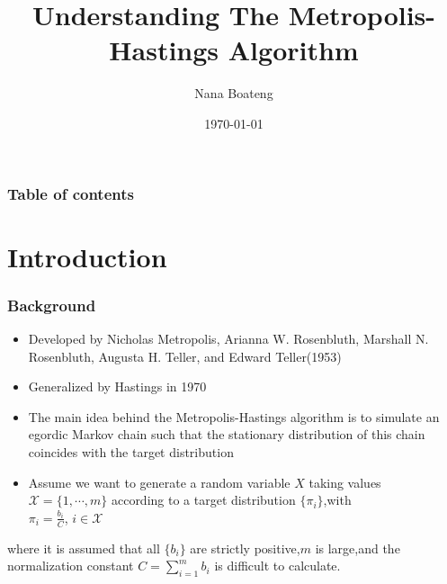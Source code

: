 \documentclass[hyperref={pdfpagelabels=false}]{beamer}
\title{Understanding The Metropolis-Hastings Algorithm}
\author{Nana Boateng }
\date{\today}
\begin{document}
\begin{frame}
\titlepage
\end{frame} 

\begin{frame}
\frametitle{Table of contents}
\tableofcontents
\end{frame}
 



\section{Introduction} 

\begin{frame}
\frametitle{Background }
\begin{itemize}
\item  Developed by Nicholas Metropolis, Arianna W. Rosenbluth, Marshall N. Rosenbluth, Augusta H. Teller, and Edward Teller(1953)
\item Generalized by Hastings in 1970
\item The main idea behind the Metropolis-Hastings algorithm  is to simulate an egordic Markov chain such that the  stationary distribution  of this chain coincides with the target distribution
\end{itemize}
\end{frame}


\begin{frame}
\begin{itemize}
\item Assume we want to generate a random variable $X$ taking values $\mathcal{X}=\{1,\cdots,m\}$ according to a target distribution $\{\pi_{i}\}$,with \\
\vspace{5mm}
$\pi_{i}=\frac{b_{i}}{C}$, \hspace{10mm}$i \in \mathcal{X}$

\end{itemize}
where it is assumed that all $\{b_{i}\}$ are strictly positive,$m$ is large,and the normalization constant 
$C=\sum_{i=1}^m b_{i}$ is difficult to calculate.

\end{frame}
\end{document}
